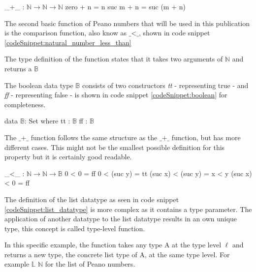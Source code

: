 \begin{codesnippet}[mathescape=true, caption={Peano numbers addition}, label={codeSnippet:natural_number_addition}]
_+_ : $\mathbb{N} \rightarrow \mathbb{N} \rightarrow \mathbb{N}$
zero  + n = n
suc m + n = suc (m + n)
\end{codesnippet}

The second basic function of Peano numbers that will be used in this publication is the comparison function, also know as $\text{\_<\_}$, shown in code snippet \ref{codeSnippet:natural_number_less_than}

The type definition of the function states that it takes two arguments of $\mathbb{N}$ and returns a $\mathbb{B}$

The boolean data type $\mathbb{B}$ consists of two constructors \emph{tt} - representing true - and \emph{ff} - representing false - is shown in code snippet \ref{codeSnippet:boolean} for completeness.

\begin{codesnippet}[mathescape=true, caption={Definition of the boolean data type in Agda}, label={codeSnippet:boolean}]
data $\mathbb{B}$: Set where
  tt : $\mathbb{B}$
  ff  : $\mathbb{B}$
\end{codesnippet}

The $\text{\_+\_}$ function follows the same structure as the $\text{\_+\_}$ function, but has more different cases. 
This might not be the smallest possible definition for this property but it is certainly good readable.

\begin{codesnippet}[mathescape=true, caption={Peano numbers less-than}, label={codeSnippet:natural_number_less_than}]
_<_ : $\mathbb{N} \rightarrow \mathbb{N} \rightarrow \mathbb{B}$
0 < 0 = ff
0 < (suc y) = tt
(suc x) < (suc y) = x < y
(suc x) < 0 = ff
\end{codesnippet}

The definition of the list datatype as seen in code snippet \ref{codeSnippet:list_datatype} is more complex as it contains a type parameter.
The application of another datatype to the list datatype results in an own unique type, this concept is called type-level function.

In this specific example, the function takes any type A at the type level $\ell$ and returns a new type, the concrete list type of A, at the same type level.
For example $\mathbb{L}$ $\mathbb{N}$ for the list of Peano numbers.

